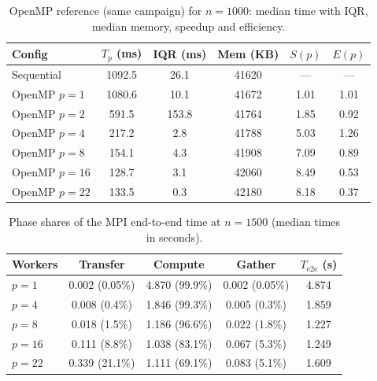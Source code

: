 \documentclass[12pt,a4paper]{article}
\begin{document}
\begin{table}[h]
\centering
\caption{OpenMP reference (same campaign) for $n = 1000$: median time with
IQR, median memory, speedup and efficiency.}
\label{tab:omp}
\begin{tabular}{@{}lccccc@{}}
\toprule
Config & $T_p$ (ms) & IQR (ms) & Mem (KB) & $S(p)$ & $E(p)$ \\
\midrule
Sequential & 1092.5 & 26.1 & 41620 & --- & --- \\
OpenMP $p=1$ & 1080.6 & 10.1 & 41672 & 1.01 & 1.01 \\
OpenMP $p=2$ & 591.5 & 153.8 & 41764 & 1.85 & 0.92 \\
OpenMP $p=4$ & 217.2 & 2.8 & 41788 & 5.03 & 1.26 \\
OpenMP $p=8$ & 154.1 & 4.3 & 41908 & 7.09 & 0.89 \\
OpenMP $p=16$ & 128.7 & 3.1 & 42060 & 8.49 & 0.53 \\
OpenMP $p=22$ & 133.5 & 0.3 & 42180 & 8.18 & 0.37 \\
\bottomrule
\end{tabular}
\end{table}

\begin{table}[h]
\centering
\caption{Phase shares of the MPI end-to-end time at $n = 1500$ (median
times in seconds).}
\label{tab:phases}
\begin{tabular}{@{}lcccc@{}}
\toprule
Workers & Transfer & Compute & Gather & $T_{\mathrm{e2e}}$ (s) \\
\midrule
$p=1$ & 0.002 (0.05\%) & 4.870 (99.9\%) & 0.002 (0.05\%) & 4.874 \\
$p=4$ & 0.008 (0.4\%) & 1.846 (99.3\%) & 0.005 (0.3\%) & 1.859 \\
$p=8$ & 0.018 (1.5\%) & 1.186 (96.6\%) & 0.022 (1.8\%) & 1.227 \\
$p=16$ & 0.111 (8.8\%) & 1.038 (83.1\%) & 0.067 (5.3\%) & 1.249 \\
$p=22$ & 0.339 (21.1\%) & 1.111 (69.1\%) & 0.083 (5.1\%) & 1.609 \\
\bottomrule
\end{tabular}
\end{table}
\end{document}
